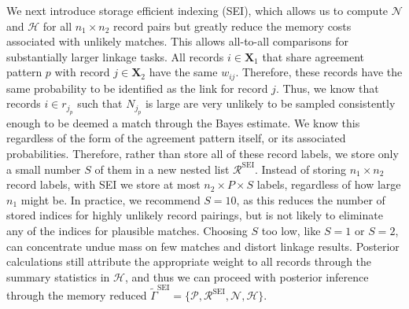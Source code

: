 \documentclass[ba]{imsart}
\begin{document}
We next introduce storage efficient indexing (SEI), which allows us to compute $\mathcal{N}$ and $\mathcal{H}$ for all $n_1 \times n_2$ record pairs but greatly reduce the memory costs associated with unlikely matches. This allows all-to-all comparisons for substantially larger linkage tasks. All records $i \in \bm{X}_1$ that share agreement pattern $p$ with record $j \in \bm{X}_2$ have the same $w_{ij}$. Therefore, these records have the same probability to be identified as the link for record $j$. Thus, we know that records $i \in r_{j_p}$ such that $N_{j_p}$ is large are very unlikely to be sampled consistently enough to be deemed a match through the Bayes estimate. We know this regardless of the form of the agreement pattern itself, or its associated probabilities. Therefore, rather than store all of these record labels, we store only a small number \(S\) of them in a new nested list $\mathcal{R}^{\text{SEI}}$. Instead of storing \(n_1 \times n_2\) record labels, with SEI we store at most \(n_2 \times P \times S\) labels, regardless of how large \(n_1\) might be. In practice, we recommend $S=10$, as this reduces the number of stored indices for highly unlikely record pairings, but is not likely to eliminate any of the indices for plausible matches. Choosing $S$ too low, like $S=1$ or $S=2$, can concentrate undue mass on few matches and distort linkage results. Posterior calculations still attribute the appropriate weight to all records through the summary statistics in $\mathcal{H}$, and thus we can proceed with posterior inference through the memory reduced $\tilde{\Gamma}^{\text{SEI}} = \{\mathcal{P}, \mathcal{R}^{\text{SEI}}, \mathcal{N}, \mathcal{H}\}$. 

\end{document}
